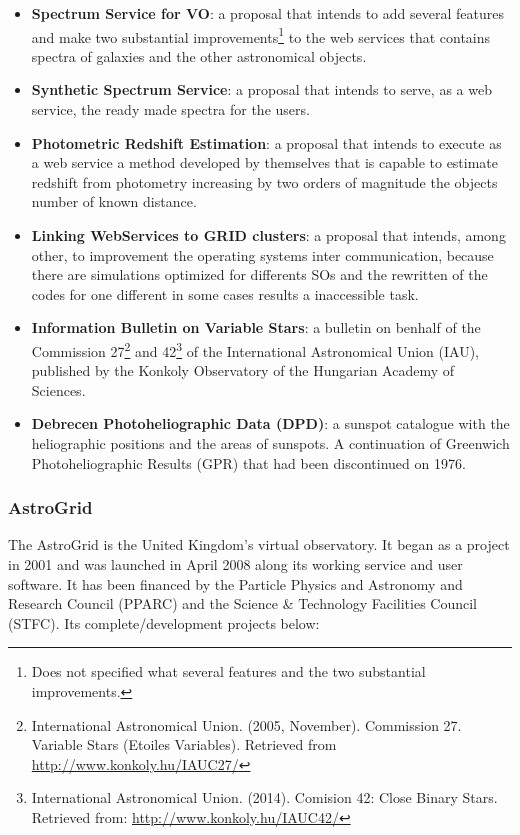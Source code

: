 \begin{itemize}
\item \textbf{Spectrum Service for VO}:
a proposal that intends to add several features and make two substantial
improvements\footnote{Does not specified what several features and the two
substantial improvements.} to the web services that contains spectra of galaxies
and the other astronomical objects.

\item \textbf{Synthetic Spectrum Service}:
a proposal that intends to serve, as a web service, the ready made spectra for
the users.

\item \textbf{Photometric Redshift Estimation}:
a proposal that intends to execute as a web service a method developed by
themselves that is capable to estimate redshift from photometry increasing by
two orders of magnitude the objects number of known distance. 

\item \textbf{Linking WebServices to GRID clusters}:
a proposal that intends, among other, to improvement the operating systems inter
communication, because there are simulations optimized for differents SOs and
the rewritten of the codes for one different in some cases results a
inaccessible task.

\item \textbf{Information Bulletin on Variable Stars}:
a bulletin on benhalf of the Commission 27\footnote{International Astronomical
Union. (2005, November). Commission 27. Variable Stars (Etoiles Variables).
Retrieved from \url{http://www.konkoly.hu/IAUC27/}} and
42\footnote{International Astronomical Union. (2014). Comision 42: Close Binary
Stars. Retrieved from: \url{http://www.konkoly.hu/IAUC42/}} of the International
Astronomical Union (IAU), published by the Konkoly Observatory of the Hungarian
Academy of Sciences. 

\item \textbf{Debrecen Photoheliographic Data (DPD)}:
a sunspot catalogue with the heliographic positions and the areas of sunspots. A
continuation of Greenwich Photoheliographic Results (GPR) that had been
discontinued on 1976.
\end{itemize}

\subsubsection{AstroGrid}
The AstroGrid \cite{website:astrogrid-home} is the United Kingdom's virtual
observatory. It began as a project in 2001 and was launched in April 2008 along
its working service and user software. It has been financed by the Particle
Physics and Astronomy and Research Council (PPARC) and the Science \& Technology
Facilities Council (STFC). Its complete/development projects below:

